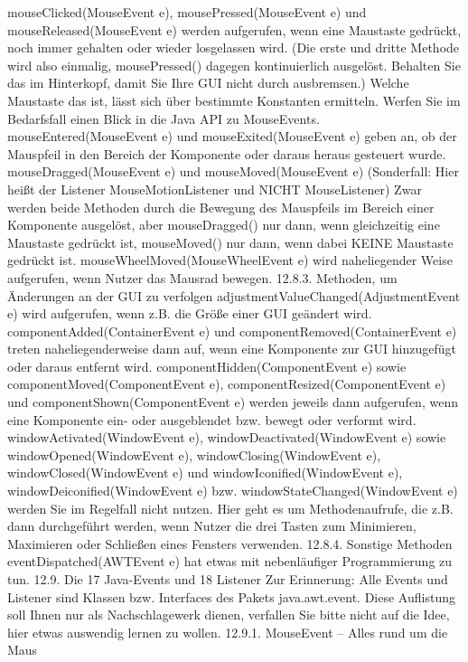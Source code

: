 mouseClicked(MouseEvent e), mousePressed(MouseEvent e) und mouseReleased(MouseEvent e)
werden aufgerufen, wenn eine Maustaste gedrückt, noch immer gehalten oder wieder losgelassen wird. (Die erste und dritte Methode wird also einmalig, mousePressed() dagegen kontinuierlich ausgelöst. Behalten Sie das im Hinterkopf, damit Sie Ihre GUI nicht durch ausbremsen.) Welche Maustaste das ist, lässt sich über bestimmte Konstanten ermitteln. Werfen Sie im Bedarfsfall einen Blick in die Java API zu MouseEvents.
mouseEntered(MouseEvent e) und mouseExited(MouseEvent e)
geben an, ob der Mauspfeil in den Bereich der Komponente oder daraus heraus gesteuert wurde. 
mouseDragged(MouseEvent e) und mouseMoved(MouseEvent e)
(Sonderfall: Hier heißt der Listener MouseMotionListener und NICHT MouseListener)
Zwar werden beide Methoden durch die Bewegung des Mauspfeils im Bereich einer Komponente ausgelöst, aber mouseDragged() nur dann, wenn gleichzeitig eine Maustaste gedrückt ist, mouseMoved() nur dann, wenn dabei KEINE Maustaste gedrückt ist.
mouseWheelMoved(MouseWheelEvent e)
wird naheliegender Weise aufgerufen, wenn Nutzer das Mausrad bewegen.
12.8.3.	Methoden, um Änderungen an der GUI zu verfolgen
adjustmentValueChanged(AdjustmentEvent e)
wird aufgerufen, wenn z.B. die Größe einer GUI geändert wird.
componentAdded(ContainerEvent e) und componentRemoved(ContainerEvent e)
treten naheliegenderweise dann auf, wenn eine Komponente zur GUI hinzugefügt oder daraus entfernt wird.
componentHidden(ComponentEvent e) sowie componentMoved(ComponentEvent e), componentResized(ComponentEvent e) und componentShown(ComponentEvent e)
werden jeweils dann aufgerufen, wenn eine Komponente ein- oder ausgeblendet bzw. bewegt oder verformt wird.
windowActivated(WindowEvent e), windowDeactivated(WindowEvent e) sowie windowOpened(WindowEvent e), windowClosing(WindowEvent e), windowClosed(WindowEvent e) und windowIconified(WindowEvent e), windowDeiconified(WindowEvent e)
bzw. windowStateChanged(WindowEvent e)
werden Sie im Regelfall nicht nutzen. Hier geht es um Methodenaufrufe, die z.B. dann durchgeführt werden, wenn Nutzer die drei Tasten zum Minimieren, Maximieren oder Schließen eines Fensters verwenden.
12.8.4.	Sonstige Methoden
eventDispatched(AWTEvent e)
hat etwas mit nebenläufiger Programmierung zu tun.
12.9.	Die 17 Java-Events und 18 Listener
Zur Erinnerung: Alle Events und Listener sind Klassen bzw. Interfaces des Pakets java.awt.event. Diese Auflistung soll Ihnen nur als Nachschlagewerk dienen, verfallen Sie bitte nicht auf die Idee, hier etwas auswendig lernen zu wollen.
12.9.1.	MouseEvent – Alles rund um die Maus
